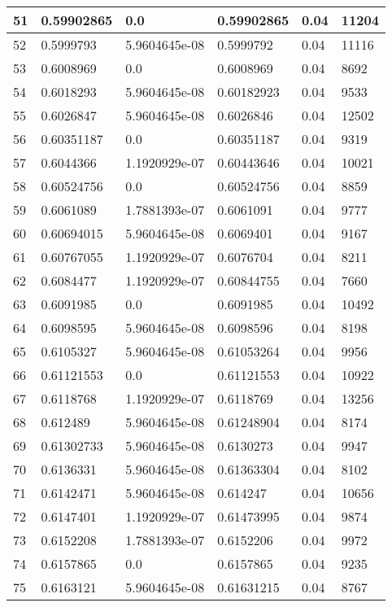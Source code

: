 \begin{longtable}{|l|l|l|l|l|l|}
51 & 0.59902865 & 0.0 & 0.59902865 & 0.04 & 11204 \\ \hline 
52 & 0.5999793 & 5.9604645e-08 & 0.5999792 & 0.04 & 11116 \\ \hline 
53 & 0.6008969 & 0.0 & 0.6008969 & 0.04 & 8692 \\ \hline 
54 & 0.6018293 & 5.9604645e-08 & 0.60182923 & 0.04 & 9533 \\ \hline 
55 & 0.6026847 & 5.9604645e-08 & 0.6026846 & 0.04 & 12502 \\ \hline 
56 & 0.60351187 & 0.0 & 0.60351187 & 0.04 & 9319 \\ \hline 
57 & 0.6044366 & 1.1920929e-07 & 0.60443646 & 0.04 & 10021 \\ \hline 
58 & 0.60524756 & 0.0 & 0.60524756 & 0.04 & 8859 \\ \hline 
59 & 0.6061089 & 1.7881393e-07 & 0.6061091 & 0.04 & 9777 \\ \hline 
60 & 0.60694015 & 5.9604645e-08 & 0.6069401 & 0.04 & 9167 \\ \hline 
61 & 0.60767055 & 1.1920929e-07 & 0.6076704 & 0.04 & 8211 \\ \hline 
62 & 0.6084477 & 1.1920929e-07 & 0.60844755 & 0.04 & 7660 \\ \hline 
63 & 0.6091985 & 0.0 & 0.6091985 & 0.04 & 10492 \\ \hline 
64 & 0.6098595 & 5.9604645e-08 & 0.6098596 & 0.04 & 8198 \\ \hline 
65 & 0.6105327 & 5.9604645e-08 & 0.61053264 & 0.04 & 9956 \\ \hline 
66 & 0.61121553 & 0.0 & 0.61121553 & 0.04 & 10922 \\ \hline 
67 & 0.6118768 & 1.1920929e-07 & 0.6118769 & 0.04 & 13256 \\ \hline 
68 & 0.612489 & 5.9604645e-08 & 0.61248904 & 0.04 & 8174 \\ \hline 
69 & 0.61302733 & 5.9604645e-08 & 0.6130273 & 0.04 & 9947 \\ \hline 
70 & 0.6136331 & 5.9604645e-08 & 0.61363304 & 0.04 & 8102 \\ \hline 
71 & 0.6142471 & 5.9604645e-08 & 0.614247 & 0.04 & 10656 \\ \hline 
72 & 0.6147401 & 1.1920929e-07 & 0.61473995 & 0.04 & 9874 \\ \hline 
73 & 0.6152208 & 1.7881393e-07 & 0.6152206 & 0.04 & 9972 \\ \hline 
74 & 0.6157865 & 0.0 & 0.6157865 & 0.04 & 9235 \\ \hline 
75 & 0.6163121 & 5.9604645e-08 & 0.61631215 & 0.04 & 8767 \\ \hline 
\end{longtable}